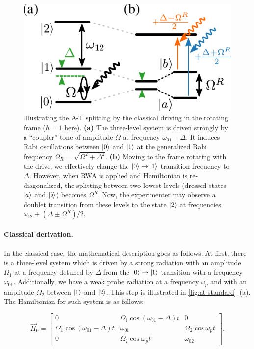 \documentclass[%
 aip,
 amsmath,amssymb,
 reprint,%
]{revtex4-1}
\begin{document}
\begin{figure}
	\includegraphics[width=\linewidth]{intro_scheme}
	\caption{Illustrating the A-T splitting by  the classical driving in the rotating frame ($\hbar=1$ here). \textbf{(a)} The three-level system is driven strongly by a ``coupler'' tone of amplitude $\Omega$ at frequency $\omega_{01}-\Delta$. It induces Rabi oscillations between $\ket{0}$ and $\ket{1}$ at the generalized Rabi frequency $\Omega_R = \sqrt{\Omega^2 + \Delta^2}$. \textbf{(b)} Moving to the frame rotating with the drive, we effectively change the $\ket{0}\rightarrow \ket{1}$ transition frequency to $\Delta$. However, when RWA is applied and Hamiltonian is re-diagonalized, the splitting between two lowest levels (dressed states $\ket{a}$ and $\ket{b}$) becomes $\Omega^R$. Now, the experimenter may observe a doublet transition from these levels to the state $\ket{2}$ at frequencies $\omega_{12}+(\Delta \pm \Omega^R)/2$.} 
	\label{fig:at-standard}
\end{figure}

\paragraph{Classical derivation.} In the classical case, the mathematical description goes as follows. At first, there is a three-level system which is driven by a strong radiation with an amplitude $\Omega_1$ at a frequency detuned by $\Delta$ from the $\ket{0}\rightarrow \ket{1}$ transition with a frequency $\omega_{01}$. Additionally, we have a weak probe radiation at a frequency $\omega_{p}$ and with an amplitude $\Omega_2$ between $\ket{1}$ and $\ket{2}$. This step is illustrated in \autoref{fig:at-standard}~(a). The Hamiltonian for such system is as follows:

\begin{equation*}
\hat H^c_0 = \left[\begin{matrix}
0 & \Omega_{1} \cos{\left(\omega_{01}- \Delta \right)t} & 0\\
\Omega_{1} \cos{\left(\omega_{01} - \Delta \right)t}   & \omega_{01} &\Omega_{2} \cos\omega_p t  \\
0 & \Omega_{2} \cos{\omega_p t}  & \omega_{02}\end{matrix}\right].
\end{equation*}
\end{document}
